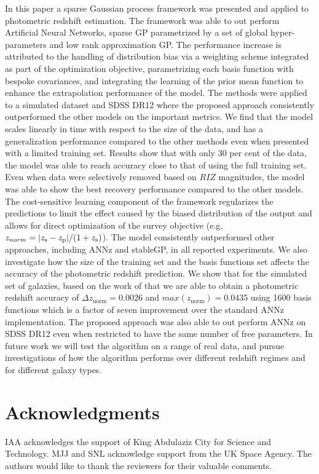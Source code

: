 \documentclass[useAMS,usenatbib,fleqn]{mn2e}
\begin{document}
In this paper a sparse Gaussian process framework was presented and applied to photometric redshift estimation. The framework was able to out perform Artificial Neural Networks, sparse GP parametrized by a set of global hyper-parameters and low rank approximation GP. The performance increase is attributed to the handling of distribution bias via a weighting scheme integrated as part of the optimization objective, parametrizing each basis function with bespoke covariances, and integrating the learning of the prior mean function to enhance the extrapolation performance of the model. The methods were applied to a simulated dataset and SDSS DR12 where the proposed approach consistently outperformed the other models on the important metrics. We find that the model scales linearly in time with respect to the size of the data, and has a generalization performance compared to the other methods even when presented with a limited training set. Results show that with only 30 per cent of the data, the model was able to reach accuracy close to that of using the full training set. Even when data were selectively removed based on $RIZ$ magnitudes, the model was able to show the best recovery performance compared to the other models. The cost-sensitive learning component of the framework regularizes the predictions to limit the effect caused by the biased distribution of the output and allows for direct optimization of the survey objective (e.g. $z_{norm} = |z_\textrm{s} - z_\textrm{p}| / (1+z_{\rm s})$). The model consistently outperformed other approaches, including {\sc ANNz} and {\sc stableGP}, in all reported experiments. We also investigate how the size of the training set and the basis functions set affects the accuracy of the photometric redshift prediction. We show that for the simulated set of galaxies, based on the work of \citet{jouvel09} that we are able to obtain a photometric redshift accuracy of $\Delta z_\textrm{norm}  = 0.0026$ and $max\left(z_\textrm{norm}\right)=0.0435$ using 1600 basis functions which is a factor of seven improvement over the standard {\sc ANNz} implementation. The proposed approach was also able to out perform {\sc ANNz} on SDSS DR12 even when restricted to have the same number of free parameters. In future work we will test the algorithm on a range of real data, and pursue investigations of how the algorithm performs over different redshift regimes and for different galaxy types. 




\section*{Acknowledgments}
IAA acknowledges the support of King Abdulaziz City for Science and Technology.
MJJ and SNL acknowledge support from the UK Space Agency. The authors would like to thank the reviewers for their valuable comments.
\balance
\footnotesize{


}

\label{lastpage}
\end{document}
